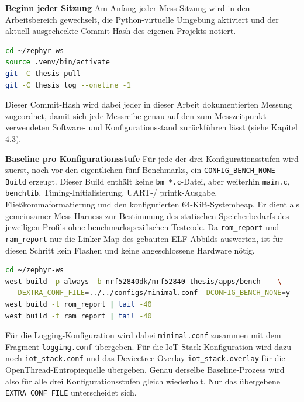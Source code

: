 \textbf{Beginn jeder Sitzung }Am Anfang jeder Mess-Sitzung wird in den Arbeitsbereich gewechselt, die Python-virtuelle Umgebung aktiviert und der aktuell ausgecheckte Commit-Hash des eigenen Projekts notiert.

\begin{lstlisting}[style=basecode,language=BAsh]
cd ~/zephyr-ws
source .venv/bin/activate
git -C thesis pull
git -C thesis log --oneline -1
\end{lstlisting}
Dieser Commit-Hash wird dabei jeder in dieser Arbeit dokumentierten Messung zugeordnet, damit sich jede Messreihe genau auf den zum Messzeitpunkt verwendeten Software- und Konfigurationsstand zurückführen lässt (siehe Kapitel 4.3).

\textbf{Baseline pro Konfigurationsstufe }Für jede der drei Konfigurationsstufen wird zuerst, noch vor den eigentlichen fünf Benchmarks, ein \lstinline[style=fileinline]|CONFIG_BENCH_NONE-Build| erzeugt. Dieser Build enthält keine \lstinline[style=fileinline]|bm_*.c|-Datei, aber weiterhin \lstinline[style=fileinline]|main.c|, \lstinline[style=fileinline]|benchlib|, Timing-Initialisierung, UART-/ printk-Ausgabe, Fließkommaformatierung und den konfigurierten 64-KiB-Systemheap. Er dient als gemeinsamer Mess-Harness zur Bestimmung des statischen Speicherbedarfs des jeweiligen Profils ohne benchmarkspezifischen Testcode. Da \lstinline[style=fileinline]|rom_report| und \lstinline[style=fileinline]|ram_report| nur die Linker-Map des gebauten ELF-Abbilds auswerten, ist für diesen Schritt kein Flashen und keine angeschlossene Hardware nötig.

\begin{lstlisting}[style=basecode,language=BAsh]
cd ~/zephyr-ws
west build -p always -b nrf52840dk/nrf52840 thesis/apps/bench -- \
  -DEXTRA_CONF_FILE=../../configs/minimal.conf -DCONFIG_BENCH_NONE=y
west build -t rom_report | tail -40
west build -t ram_report | tail -40
\end{lstlisting}
Für die Logging-Konfiguration wird dabei \lstinline[style=fileinline]|minimal.conf| zusammen mit dem Fragment \lstinline[style=fileinline]|logging.conf| übergeben. Für die IoT-Stack-Konfiguration wird dazu noch \lstinline[style=fileinline]|iot_stack.conf| und das Devicetree-Overlay \lstinline[style=fileinline]|iot_stack.overlay| für die OpenThread-Entropiequelle übergeben. Genau derselbe Baseline-Prozess wird also für alle drei Konfigurationsstufen gleich wiederholt. Nur das übergebene \lstinline[style=fileinline]|EXTRA_CONF_FILE| unterscheidet sich.

